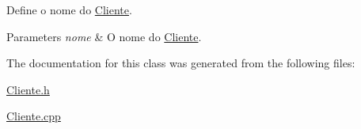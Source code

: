 Define o nome do \hyperlink{class_cliente}{Cliente}. 


\begin{DoxyParams}{Parameters}
{\em nome} & O nome do \hyperlink{class_cliente}{Cliente}. \\
\hline
\end{DoxyParams}


The documentation for this class was generated from the following files\+:\begin{DoxyCompactItemize}
\item 
\hyperlink{_cliente_8h}{Cliente.\+h}\item 
\hyperlink{_cliente_8cpp}{Cliente.\+cpp}\end{DoxyCompactItemize}
